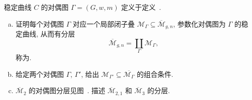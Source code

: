 \begin{exercise}\label{src:6.6.23}
稳定曲线 $C$ 的对偶图 $\Gamma=(G,\allowbreak w,\allowbreak m)$ 定义于定义~.
\begin{enumerate}[(a)]
\item 证明每个对偶图 $\Gamma$ 对应一个局部闭子叠 $\mathcal M_\Gamma\subseteq\overline{\mathcal M}_{g,\allowbreak n}$, 参数化对偶图为 $\Gamma$ 的稳定曲线, 从而有分层
\[
\overline{\mathcal M}_{g,n}=\coprod_\Gamma\mathcal M_\Gamma,
\]
称为.
\item 给定两个对偶图 $\Gamma$, $\Gamma'$, 给出 $\mathcal M_{\Gamma'}\subseteq\overline{\mathcal M_\Gamma}$ 的组合条件.
\item $\overline{\mathcal M}_2$ 的对偶图分层见图~. 描述 $\overline{\mathcal M}_{2,\allowbreak 1}$ 和 $\overline{\mathcal M}_3$ 的分层.
\end{enumerate}
\end{exercise}
